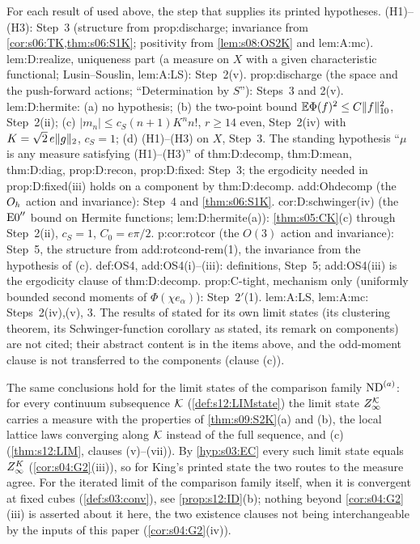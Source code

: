 \begin{remark}\label{rem:s09:v1match}
For each result of \cite{SymPhase} used above, the step that supplies its printed hypotheses. (H1)--(H3): Step~3 (structure from prop:discharge; invariance from \cref{cor:s06:TK,thm:s06:S1K}; positivity from \cref{lem:s08:OS2K} and lem:A:mc). lem:D:realize, uniqueness part (a measure on $X$ with a given characteristic functional; Lusin--Souslin, lem:A:LS): Step~2(v). prop:discharge (the space and the push-forward actions; ``Determination by $S$''): Steps~3 and 2(v). lem:D:hermite: (a) no hypothesis; (b) the two-point bound $\mathbb E\Phi(f)^2\le C\lVert f\rVert_{10}^2$, Step~2(ii); (c) $|m_n|\le c_S(n+1)K^nn!$, $r\ge14$ even, Step~2(iv) with $K=\sqrt2\,e\lVert g\rVert_2$, $c_S=1$; (d) (H1)--(H3) on $X$, Step~3. The standing hypothesis ``$\mu$ is any measure satisfying (H1)--(H3)'' of thm:D:decomp, thm:D:mean, thm:D:diag, prop:D:recon, prop:D:fixed: Step~3; the ergodicity needed in prop:D:fixed(iii) holds on a component by thm:D:decomp. add:Ohdecomp (the $O_h$ action and invariance): Step~4 and \cref{thm:s06:S1K}. cor:D:schwinger(iv) (the $\mathrm{E0}''$ bound on Hermite functions; lem:D:hermite(a)): \cref{thm:s05:CK}(c) through Step~2(ii), $c_S=1$, $C_0=e\pi/2$. p:cor:rotcor (the $O(3)$ action and invariance): Step~5, the structure from add:rotcond-rem(1), the invariance from the hypothesis of (c). def:OS4, add:OS4(i)--(iii): definitions, Step~5; add:OS4(iii) is the ergodicity clause of thm:D:decomp. prop:C-tight, mechanism only (uniformly bounded second moments of $\Phi(\chi e_\alpha)$): Step~$2'$(1). lem:A:LS, lem:A:mc: Steps~2(iv),(v), 3. The results of \cite{SymPhase} stated for its own limit states (its clustering theorem, its Schwinger-function corollary as stated, its remark on components) are not cited; their abstract content is in the items above, and the odd-moment clause is not transferred to the components (clause (c)).
\end{remark}

\begin{remark}\label{rem:s09:components}
The same conclusions hold for the limit states of the comparison family $\mathrm{ND}^{(a)}$: for every continuum subsequence $\mathcal K$ (\cref{def:s12:LIMstate}) the limit state $Z^{\mathcal K}_{\infty}$ carries a measure with the properties of \cref{thm:s09:S2K}(a) and (b), the local lattice laws converging along $\mathcal K$ instead of the full sequence, and (c) (\cref{thm:s12:LIM}, clauses (v)--(vii)). By \cref{hyp:s03:EC} every such limit state equals $Z^{K}_{\infty}$ (\cref{cor:s04:G2}(iii)), so for King's printed state the two routes to the measure agree. For the iterated limit of the comparison family itself, when it is convergent at fixed cubes (\cref{def:s03:conv}), see \cref{prop:s12:ID}(b); nothing beyond \cref{cor:s04:G2}(iii) is asserted about it here, the two existence clauses not being interchangeable by the inputs of this paper (\cref{cor:s04:G2}(iv)).
\end{remark}
